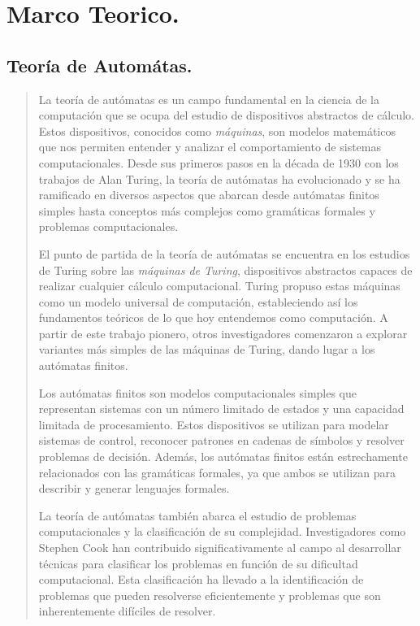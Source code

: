 \documentclass{article}
\begin{document}
\section{Marco Teorico.}
    \subsection{Teoría de Automátas.}
        \begin{quote}
            La teoría de autómatas es un campo fundamental en la ciencia de la computación que se ocupa del estudio de dispositivos
            abstractos de cálculo. Estos dispositivos, conocidos como \textit{máquinas}, son modelos matemáticos que nos permiten entender y
            analizar el comportamiento de sistemas computacionales. Desde sus primeros pasos en la década de 1930 con los trabajos de
            Alan Turing, la teoría de autómatas ha evolucionado y se ha ramificado en diversos aspectos que abarcan desde autómatas finitos
            simples hasta conceptos más complejos como gramáticas formales y problemas computacionales.

            El punto de partida de la teoría de autómatas se encuentra en los estudios de Turing sobre las \textit{máquinas de Turing},
            dispositivos abstractos capaces de realizar cualquier cálculo computacional. Turing propuso estas máquinas como un modelo universal
            de computación, estableciendo así los fundamentos teóricos de lo que hoy entendemos como computación. A partir de este trabajo pionero,
            otros investigadores comenzaron a explorar variantes más simples de las máquinas de Turing, dando lugar a los autómatas finitos.

            Los autómatas finitos son modelos computacionales simples que representan sistemas con un número limitado de estados y una capacidad
            limitada de procesamiento. Estos dispositivos se utilizan para modelar sistemas de control, reconocer patrones en cadenas de
            símbolos y resolver problemas de decisión. Además, los autómatas finitos están estrechamente relacionados con las gramáticas
            formales, ya que ambos se utilizan para describir y generar lenguajes formales.

            La teoría de autómatas también abarca el estudio de problemas computacionales y la clasificación de su complejidad. Investigadores
            como Stephen Cook han contribuido significativamente al campo al desarrollar técnicas para clasificar los problemas en función de
            su dificultad computacional. Esta clasificación ha llevado a la identificación de problemas que pueden resolverse eficientemente y
            problemas que son inherentemente difíciles de resolver.\cite{hopcroft2007introduccion}
        \end{quote}
\end{document}
